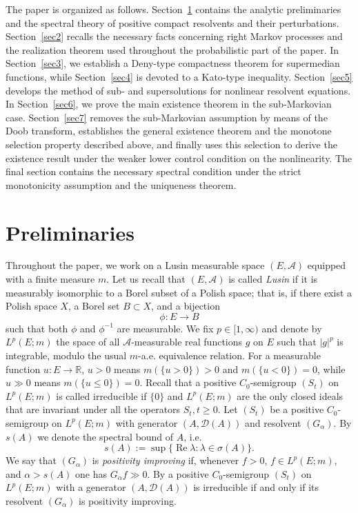 \documentclass[11pt,a4paper,reqno]{amsart}
\theoremstyle{definition}
\numberwithin{equation}{section}
\begin{document}
The paper is organized as follows. Section~\ref{sec.prelim} contains the
analytic preliminaries and the spectral theory of positive compact
resolvents and their perturbations. Section~\ref{sec2} recalls the necessary
facts concerning right Markov processes and the realization theorem used
throughout the probabilistic part of the paper. In Section~\ref{sec3}, we
establish a Deny-type compactness theorem for supermedian functions, while
Section~\ref{sec4} is devoted to a Kato-type inequality. Section~\ref{sec5}
develops the method of sub- and supersolutions for nonlinear resolvent
equations. In Section~\ref{sec6}, we prove the main existence theorem in the
sub-Markovian case. 
Section~\ref{sec7} removes the sub-Markovian assumption by means of the
Doob transform, establishes the general existence theorem and the
monotone selection property described above, and finally uses this
selection to derive the existence result under the weaker lower control condition
on the nonlinearity.
The final section contains the necessary spectral condition under the strict
monotonicity assumption and the uniqueness theorem.






\section{Preliminaries}
\label{sec.prelim}


Throughout the paper, we work on a Lusin measurable space $(E,\mathcal A)$ equipped with a finite measure $m$. 
Let us recall that  $(E,\mathcal{A})$ is called \emph{Lusin} if it is measurably isomorphic to a Borel subset of a Polish space; 
that is, if there exist a Polish space $X$, a Borel set $B \subset X$, and a bijection
\[
\phi : E \to B
\]
such that both $\phi$ and $\phi^{-1}$ are measurable.
We fix  $p\in [1,\infty)$ and denote  by $L^p(E;m)$ the space of all $\mathcal A$-measurable real functions 
$g$ on $E$ such that $|g|^p$ is integrable, modulo the usual $m$-a.e. equivalence relation.
For a measurable function $u:E\to\mathbb R$, $u>0$ means $m(\{u>0\})>0$ and $m(\{u<0\})=0$, 
while $u\gg 0$ means $m(\{u\le 0\})=0$. 
Recall that a positive $C_0$-semigroup $(S_t)$ on  $L^p(E;m)$
is called irreducible if $\{0\}$ and $L^p(E;m)$ are the only closed ideals 
that are invariant under all the operators $S_t, t \geq 0$.   Let $(S_t)$ be a positive $C_0$-semigroup  on  $L^p(E;m)$
with generator $(A,\mathscr D(A))$ and resolvent $(G_\alpha)$. By $s(A)$ we denote the spectral bound of $A$, i.e. 
\[
s(A):=\sup \{\operatorname{Re} \lambda: \lambda \in \sigma(A)\}.
\]
We say that $(G_\alpha)$ is {\em positivity improving} if, whenever  $f>0$, 
$f\in L^p(E;m)$, and $\alpha>s(A)$ one has  $G_\alpha f\gg0$.
By \cite[Proposition 14.10]{BatkaiKramarFijavzRhandi2017} a positive $C_0$-semigroup $(S_t)$ on 
$L^p(E;m)$ with a generator $(A,\mathscr D(A))$ is irreducible if and only if its resolvent $(G_\alpha)$ is positivity improving. 
\end{document}
